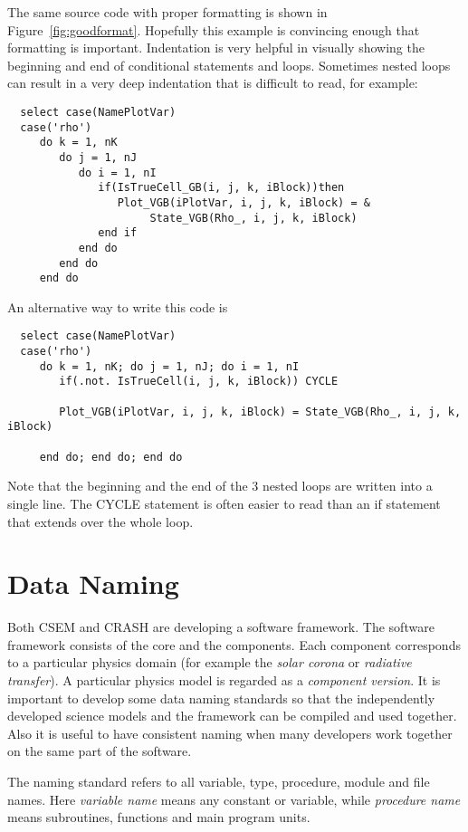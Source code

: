 \documentclass{article}
\begin{document}
The same source code with proper formatting is shown in 
Figure~\ref{fig:goodformat}.
Hopefully this example is convincing enough that formatting is important.
Indentation is very helpful in visually showing the beginning and end of
conditional statements and loops. Sometimes nested loops can result in 
a very deep indentation that is difficult to read, for example:
\begin{verbatim}
  select case(NamePlotVar)
  case('rho')
     do k = 1, nK
        do j = 1, nJ
           do i = 1, nI
              if(IsTrueCell_GB(i, j, k, iBlock))then
                 Plot_VGB(iPlotVar, i, j, k, iBlock) = &
                      State_VGB(Rho_, i, j, k, iBlock)
              end if
           end do
        end do
     end do
\end{verbatim}
An alternative way to write this code is
\begin{verbatim}
  select case(NamePlotVar)
  case('rho')
     do k = 1, nK; do j = 1, nJ; do i = 1, nI
        if(.not. IsTrueCell(i, j, k, iBlock)) CYCLE

        Plot_VGB(iPlotVar, i, j, k, iBlock) = State_VGB(Rho_, i, j, k, iBlock)

     end do; end do; end do
\end{verbatim}
Note that the beginning and the end of the 3 nested loops are written into a 
single line. The CYCLE statement is often easier to read than an if statement
that extends over the whole loop. 

\section{Data Naming}

Both CSEM and CRASH are developing a software framework.
The software framework consists of the core and the components.
Each component corresponds to a particular physics domain 
(for example the {\it solar corona} or {\it radiative transfer}). 
A particular physics model is regarded as a {\it component version}.
It is important to develop some data naming
standards so that the independently developed science models 
and the framework can be compiled and used together. Also it is useful
to have consistent naming when many developers work together
on the same part of the software.

The naming standard refers to all variable, type, procedure, module and file 
names. Here {\it variable name} means any constant or variable, while 
{\it procedure name} means subroutines, functions and main program units.
\end{document}
